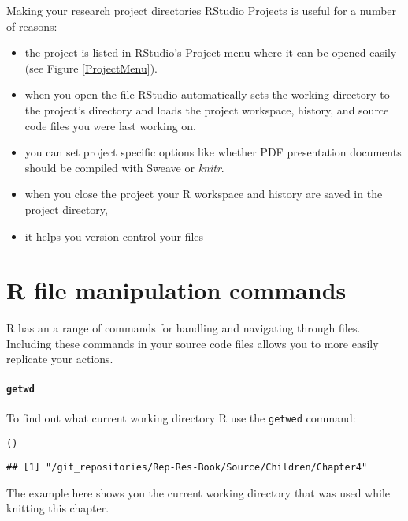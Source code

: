 Making your research project directories RStudio Projects is useful for a number of reasons:

\begin{itemize}
    \item the project is listed in RStudio's Project menu where it can be opened easily (see Figure \ref{ProjectMenu}).
    \item when you open the  file RStudio automatically sets the working directory to the project's directory and loads the project workspace, history, and source code files you were last working on.
    \item you can set project specific options like whether PDF presentation documents should be compiled with Sweave or {\emph{knitr}}.
    \item when you close the project your R workspace and history are saved in the project directory,
    \item it helps you version control your files
\end{itemize}

\section{R file manipulation commands}

R has an a range of commands for handling and navigating through files. Including these commands in your source code files allows you to more easily replicate your actions.

\paragraph{{\tt{getwd}}}

To find out what current working directory R use the \texttt{getwed} command:

\begin{knitrout}
\color{fgcolor}\begin{kframe}
\begin{alltt}
()
\end{alltt}
\begin{verbatim}
## [1] "/git_repositories/Rep-Res-Book/Source/Children/Chapter4"
\end{verbatim}
\end{kframe}
\end{knitrout}


\noindent The example here shows you the current working directory that was used while knitting this chapter.

